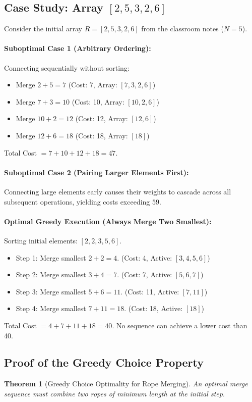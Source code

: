 \documentclass[10pt,twocolumn,letterpaper]{article}
\newtheorem{theorem}{Theorem}
\begin{document}
\subsection{Case Study: Array $[2, 5, 3, 2, 6]$}
Consider the initial array $R = [2, 5, 3, 2, 6]$ from the classroom notes ($N = 5$). 

\paragraph{Suboptimal Case 1 (Arbitrary Ordering):}
Connecting sequentially without sorting:
\begin{itemize}
    \item Merge $2 + 5 = 7$ (Cost: 7, Array: $[7, 3, 2, 6]$)
    \item Merge $7 + 3 = 10$ (Cost: 10, Array: $[10, 2, 6]$)
    \item Merge $10 + 2 = 12$ (Cost: 12, Array: $[12, 6]$)
    \item Merge $12 + 6 = 18$ (Cost: 18, Array: $[18]$)
\end{itemize}
Total Cost $= 7 + 10 + 12 + 18 = 47$.

\paragraph{Suboptimal Case 2 (Pairing Larger Elements First):}
Connecting large elements early causes their weights to cascade across all subsequent operations, yielding costs exceeding $59$.

\paragraph{Optimal Greedy Execution (Always Merge Two Smallest):}
Sorting initial elements: $[2, 2, 3, 5, 6]$.
\begin{itemize}
    \item Step 1: Merge smallest $2 + 2 = 4$. (Cost: 4, Active: $[3, 4, 5, 6]$)
    \item Step 2: Merge smallest $3 + 4 = 7$. (Cost: 7, Active: $[5, 6, 7]$)
    \item Step 3: Merge smallest $5 + 6 = 11$. (Cost: 11, Active: $[7, 11]$)
    \item Step 4: Merge smallest $7 + 11 = 18$. (Cost: 18, Active: $[18]$)
\end{itemize}
Total Cost $= 4 + 7 + 11 + 18 = 40$. No sequence can achieve a lower cost than 40.

\subsection{Proof of the Greedy Choice Property}
\begin{theorem}[Greedy Choice Optimality for Rope Merging]
An optimal merge sequence must combine two ropes of minimum length at the initial step.
\end{theorem}
\end{document}
